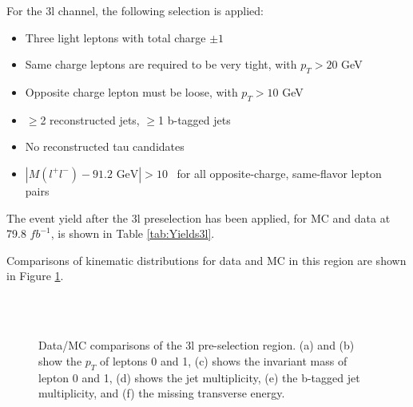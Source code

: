 For the 3l channel, the following selection is applied:

\begin{itemize}
  \item Three light leptons with total charge $\pm 1$
  \item Same charge leptons are required to be very tight, with $p_T > 20$ GeV
  \item Opposite charge lepton must be loose, with $p_T > 10$ GeV
  \item $\geq$2 reconstructed jets, $\geq$1 b-tagged jets                                              
  \item No reconstructed tau candidates
  \item $|M(l^+l^-)-91.2\textrm{ GeV}| > 10$~\GeV{} for all opposite-charge, same-flavor lepton pairs
\end{itemize}

The event yield after the 3l preselection has been applied, for MC and data at 79.8 $fb^{-1}$, is shown in Table \ref{tab:Yields3l}.



Comparisons of kinematic distributions for data and MC in this region are shown in Figure \ref{fig:presel3l}.

\begin{figure}[H]
    \centering
    \\                             
    \\                         
    \caption{Data/MC comparisons of the 3l pre-selection region. (a) and (b) show the $p_T$ of leptons 0 and 1, (c) shows the invariant mass of lepton 0 and 1, (d) shows the jet multiplicity, (e) the b-tagged jet multiplicity, and (f) the missing transverse energy.}
    \label{fig:presel3l}                                                                                          
\end{figure}

